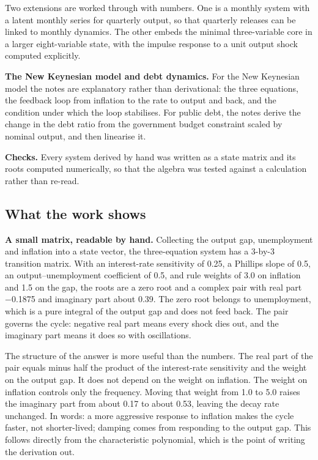 \documentclass[
  british,
  a4paper,
]{article}
\begin{document}
Two extensions are worked through with numbers. One is a monthly system
with a latent monthly series for quarterly output, so that quarterly
releases can be linked to monthly dynamics. The other embeds the minimal
three-variable core in a larger eight-variable state, with the impulse
response to a unit output shock computed explicitly.

\textbf{The New Keynesian model and debt dynamics.} For the New
Keynesian model the notes are explanatory rather than derivational: the
three equations, the feedback loop from inflation to the rate to output
and back, and the condition under which the loop stabilises. For public
debt, the notes derive the change in the debt ratio from the government
budget constraint scaled by nominal output, and then linearise it.

\textbf{Checks.} Every system derived by hand was written as a state
matrix and its roots computed numerically, so that the algebra was
tested against a calculation rather than re-read.

\subsection{What the work shows}\label{what-the-work-shows}

\textbf{A small matrix, readable by hand.} Collecting the output gap,
unemployment and inflation into a state vector, the three-equation
system has a 3-by-3 transition matrix. With an interest-rate sensitivity
of 0.25, a Phillips slope of 0.5, an output--unemployment coefficient of
0.5, and rule weights of 3.0 on inflation and 1.5 on the gap, the roots
are a zero root and a complex pair with real part −0.1875 and imaginary
part about 0.39. The zero root belongs to unemployment, which is a pure
integral of the output gap and does not feed back. The pair governs the
cycle: negative real part means every shock dies out, and the imaginary
part means it does so with oscillations.

The structure of the answer is more useful than the numbers. The real
part of the pair equals minus half the product of the interest-rate
sensitivity and the weight on the output gap. It does not depend on the
weight on inflation. The weight on inflation controls only the
frequency. Moving that weight from 1.0 to 5.0 raises the imaginary part
from about 0.17 to about 0.53, leaving the decay rate unchanged. In
words: a more aggressive response to inflation makes the cycle faster,
not shorter-lived; damping comes from responding to the output gap. This
follows directly from the characteristic polynomial, which is the point
of writing the derivation out.
\end{document}
